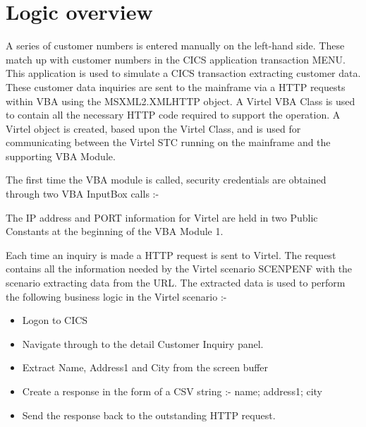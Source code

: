 \documentclass[letterpaper,10pt,english]{sphinxmanual}
\begin{document}
\chapter{Logic overview}
\label{\detokenize{TN202001:logic-overview}}
A series of customer numbers is entered manually on the left-hand side. These match up with customer numbers in the CICS application transaction MENU. This application is used to simulate a CICS transaction extracting customer data.  These customer data inquiries are sent to the mainframe via a HTTP requests within VBA using the MSXML2.XMLHTTP object.   A Virtel VBA Class is used to contain all the necessary HTTP code required to support the operation. A Virtel object is created, based upon the Virtel Class, and is used for communicating between the Virtel STC running on the mainframe and the supporting VBA Module.

The first time the VBA module is called, security credentials are obtained through two VBA InputBox calls :-

\begin{sphinxVerbatim}[commandchars=\\\{\}]
  
  
\end{sphinxVerbatim}

The IP address and PORT information for Virtel are held in two Public Constants at the beginning of the VBA Module 1.

\begin{sphinxVerbatim}[commandchars=\\\{\}]
     
              
\end{sphinxVerbatim}

Each time an inquiry is made a HTTP request is sent to Virtel. The request contains all the information needed by the Virtel scenario SCENPENF with the scenario extracting data from the URL. The extracted data is used to perform the following business logic in the Virtel scenario :-
\begin{itemize}
\item {} 
Logon to CICS

\item {} 
Navigate through to the detail Customer Inquiry panel.

\item {} 
Extract Name, Address1 and City from the screen buffer

\item {} 
Create a response in the form of a CSV string :- name; address1; city

\item {} 
Send the response back to the outstanding HTTP request.

\end{itemize}
\end{document}
